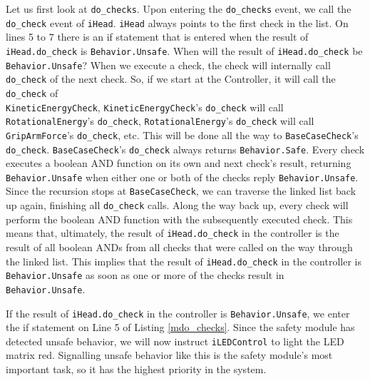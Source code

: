 \documentclass[12pt]{scrreprt}
\begin{document}
Let us first look at \texttt{do\_checks}. Upon entering the \texttt{do\_checks} event, we call the \texttt{do\_check} event of \texttt{iHead}. \texttt{iHead} always points to the first check in the list. On lines 5 to 7 there is an if statement that is entered when the result of \texttt{iHead.do\_check} is \texttt{Behavior.Unsafe}. When will the result of \texttt{iHead.do\_check} be \texttt{Behavior.Unsafe}? When we execute a check, the check will internally call \texttt{do\_check} of the next check. So, if we start at the Controller, it will call the \texttt{do\_check} of\\\texttt{KineticEnergyCheck}, \texttt{KineticEnergyCheck}'s \texttt{do\_check} will call \texttt{RotationalEnergy}'s \texttt{do\_check}, \texttt{RotationalEnergy}'s \texttt{do\_check} will call \texttt{GripArmForce}'s \texttt{do\_check}, etc. This will be done all the way to \texttt{BaseCaseCheck}'s \texttt{do\_check}. \texttt{BaseCaseCheck}'s \texttt{do\_check} always returns \texttt{Behavior.Safe}. Every check executes a boolean AND function on its own and next check's result, returning \texttt{Behavior.Unsafe} when either one or both of the checks reply \texttt{Behavior.Unsafe}. Since the recursion stops at \texttt{BaseCaseCheck}, we can traverse the linked list back up again, finishing all \texttt{do\_check} calls. Along the way back up, every check will perform the boolean AND function with the subsequently executed check. This means that, ultimately, the result of \texttt{iHead.do\_check} in the controller is the result of all boolean ANDs from all checks that were called on the way through the linked list. This implies that the result of \texttt{iHead.do\_check} in the controller is \texttt{Behavior.Unsafe} as soon as one or more of the checks result in \texttt{Behavior.Unsafe}.
\par
If the result of \texttt{iHead.do\_check} in the controller is \texttt{Behavior.Unsafe}, we enter the if statement on Line 5 of Listing \ref{mdo_checks}. Since the safety module has detected unsafe behavior, we will now instruct \texttt{iLEDControl} to light the LED matrix red. Signalling unsafe behavior like this is the safety module's most important task, so it has the highest priority in the system.
\par
\end{document}
